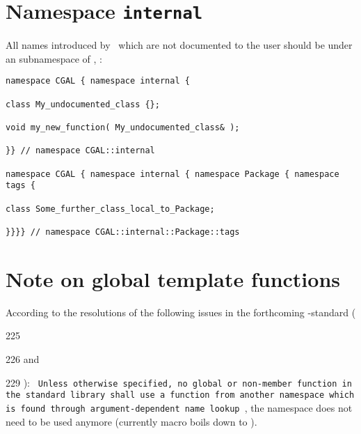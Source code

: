 \section{Namespace {\tt internal}}
All names introduced by \cgal\ which are not documented to the user
should be under an  subnamespace of , \eg:
\begin{verbatim}
namespace CGAL { namespace internal {

class My_undocumented_class {};

void my_new_function( My_undocumented_class& );

}} // namespace CGAL::internal

namespace CGAL { namespace internal { namespace Package { namespace tags {

class Some_further_class_local_to_Package;

}}}} // namespace CGAL::internal::Package::tags
\end{verbatim}


\section{Note on global template functions}

According to the resolutions of the following issues in the forthcoming
\CC-standard (
  225%
  226 and%
  229
):
{\tt
Unless otherwise specified, no global or non-member function in the standard library 
shall use a function from another namespace which is found through argument-dependent
name lookup
}, the namespace  does not need to be used anymore 
(currently  macro boils down to ).


